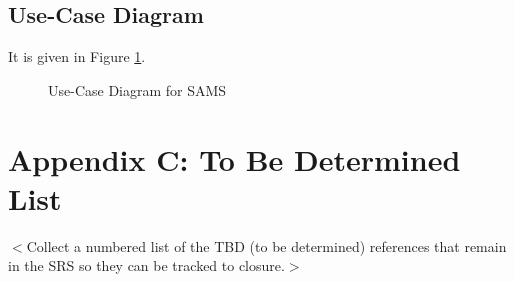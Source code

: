 \documentclass{scrreprt}
\begin{document}
\subsection{Use-Case Diagram}
It is given in Figure \ref{fig:use-case}.
\begin{figure}
	\centering
	\caption{Use-Case Diagram for SAMS}
	\label{fig:use-case}
\end{figure}

\section{Appendix C: To Be Determined List}
$<$Collect a numbered list of the TBD (to be determined) references that remain 
in the SRS so they can be tracked to closure.$>$
\end{document}
